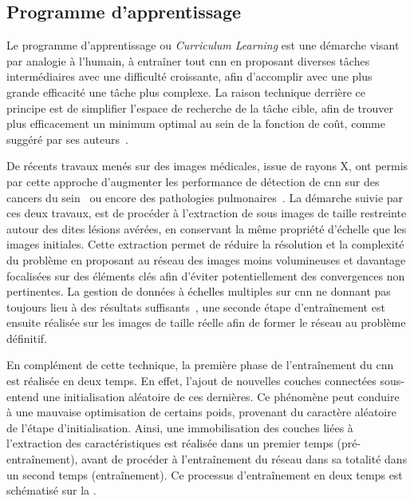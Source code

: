\subsection{Programme d'apprentissage}
Le programme d'apprentissage ou \textit{Curriculum Learning} est une démarche visant par analogie à l'humain, à entraîner tout \gls{cnn} en proposant diverses tâches intermédiaires avec une difficulté croissante, afin d'accomplir avec une plus grande efficacité une tâche plus complexe. La raison technique derrière ce principe est de simplifier l'espace de recherche de la tâche cible, afin de trouver plus efficacement un minimum optimal au sein de la fonction de coût, comme suggéré par ses auteurs~\cite{Bengio2009}.\par

De récents travaux menés sur des images médicales, issue de rayons X, ont permis par cette approche d'augmenter les performance de détection de \gls{cnn} sur des cancers du sein~\cite{Lotter2017} ou encore des pathologies pulmonaires~\cite{Park2019}. La démarche suivie par ces deux travaux, est de procéder à l'extraction de sous images de taille restreinte autour des dites lésions avérées, en conservant la même propriété d'échelle que les images initiales. Cette extraction permet de réduire la résolution et la complexité du problème en proposant au réseau des images moins volumineuses et davantage focalisées sur des éléments clés afin d'éviter potentiellement des convergences non pertinentes. La gestion de données à échelles multiples sur \gls{cnn} ne donnant pas toujours lieu à des résultats suffisants~\cite{VanNoord2017}, une seconde étape d'entraînement est ensuite réalisée sur les images de taille réelle afin de former le réseau au problème définitif.\par

En complément de cette technique, la première phase de l'entraînement du \gls{cnn} est réalisée en deux temps. En effet, l'ajout de nouvelles couches connectées sous-entend une initialisation aléatoire de ces dernières. Ce phénomène peut conduire à une mauvaise optimisation de certains poids, provenant du caractère aléatoire de l'étape d'initialisation. Ainsi, une immobilisation des couches liées à l'extraction des caractéristiques est réalisée dans un premier temps (pré-entraînement), avant de procéder à l'entraînement du réseau dans sa totalité dans un second temps (entraînement). Ce processus d'entraînement en deux temps est schématisé sur la .\par

